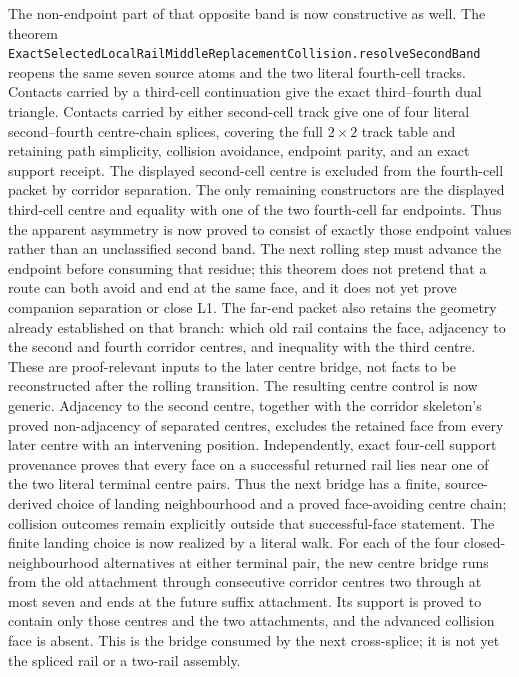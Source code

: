 \documentclass[11pt]{article}
\theoremstyle{definition}
\begin{document}
The non-endpoint part of that opposite band is now constructive as well.
The theorem
\texttt{ExactSelectedLocalRailMiddleReplacementCollision.resolveSecondBand}
reopens the same seven source atoms and the two literal fourth-cell tracks.
Contacts carried by a third-cell continuation give the exact third--fourth
dual triangle.  Contacts carried by either second-cell track give one of four
literal second--fourth centre-chain splices, covering the full $2\times2$
track table and retaining path simplicity, collision avoidance, endpoint
parity, and an exact support receipt.  The displayed second-cell centre is
excluded from the fourth-cell packet by corridor separation.  The only
remaining constructors are the displayed third-cell centre and equality with
one of the two fourth-cell far endpoints.  Thus the apparent asymmetry is now
proved to consist of exactly those endpoint values rather than an unclassified
second band.  The next rolling step must advance the endpoint before consuming
that residue; this theorem does not pretend that a route can both avoid and end
at the same face, and it does not yet prove companion separation or close L1.
The far-end packet also retains the geometry already established on that
branch: which old rail contains the face, adjacency to the second and fourth
corridor centres, and inequality with the third centre.  These are
proof-relevant inputs to the later centre bridge, not facts to be reconstructed
after the rolling transition.
The resulting centre control is now generic.  Adjacency to the second centre,
together with the corridor skeleton's proved non-adjacency of separated
centres, excludes the retained face from every later centre with an intervening
position.  Independently, exact four-cell support provenance proves that every
face on a successful returned rail lies near one of the two literal terminal
centre pairs.  Thus the next bridge has a finite, source-derived choice of
landing neighbourhood and a proved face-avoiding centre chain; collision
outcomes remain explicitly outside that successful-face statement.
The finite landing choice is now realized by a literal walk.  For each of the
four closed-neighbourhood alternatives at either terminal pair, the new centre
bridge runs from the old attachment through consecutive corridor centres two
through at most seven and ends at the future suffix attachment.  Its support
is proved to contain only those centres and the two attachments, and the
advanced collision face is absent.  This is the bridge consumed by the next
cross-splice; it is not yet the spliced rail or a two-rail assembly.
\end{document}
